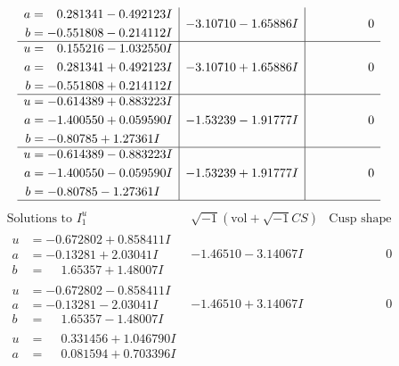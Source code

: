 \documentclass[1p]{elsarticle_modified}
\theoremstyle{definition}
\newcommand{\I}{\sqrt{-1}}
\begin{document}
$$\begin{array}{c|c|c}
\begin{aligned}
a &= \phantom{-}0.281341 - 0.492123 I \\
b &= -0.551808 - 0.214112 I\end{aligned}
 & -3.10710 - 1.65886 I & \phantom{-0.000000 } 0 \\ \hline\begin{aligned}
u &= \phantom{-}0.155216 - 1.032550 I \\
a &= \phantom{-}0.281341 + 0.492123 I \\
b &= -0.551808 + 0.214112 I\end{aligned}
 & -3.10710 + 1.65886 I & \phantom{-0.000000 } 0 \\ \hline\begin{aligned}
u &= -0.614389 + 0.883223 I \\
a &= -1.400550 + 0.059590 I \\
b &= -0.80785 + 1.27361 I\end{aligned}
 & -1.53239 - 1.91777 I & \phantom{-0.000000 } 0 \\ \hline\begin{aligned}
u &= -0.614389 - 0.883223 I \\
a &= -1.400550 - 0.059590 I \\
b &= -0.80785 - 1.27361 I\end{aligned}
 & -1.53239 + 1.91777 I & \phantom{-0.000000 } 0\\
 \hline 
 \end{array}$$\newpage$$\begin{array}{c|c|c}  
\text{Solutions to }I^u_{1}& \I (\text{vol} + \sqrt{-1}CS) & \text{Cusp shape}\\
 \hline 
\begin{aligned}
u &= -0.672802 + 0.858411 I \\
a &= -0.13281 + 2.03041 I \\
b &= \phantom{-}1.65357 + 1.48007 I\end{aligned}
 & -1.46510 - 3.14067 I & \phantom{-0.000000 } 0 \\ \hline\begin{aligned}
u &= -0.672802 - 0.858411 I \\
a &= -0.13281 - 2.03041 I \\
b &= \phantom{-}1.65357 - 1.48007 I\end{aligned}
 & -1.46510 + 3.14067 I & \phantom{-0.000000 } 0 \\ \hline\begin{aligned}
u &= \phantom{-}0.331456 + 1.046790 I \\
a &= \phantom{-}0.081594 + 0.703396 I \\

\end{aligned}
\end{array}$$
\end{document}
